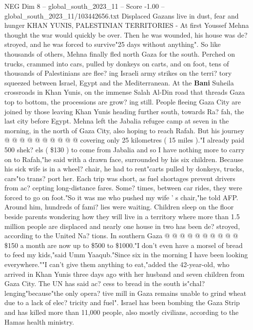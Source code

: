\begin{textsample}{NEG Dim 8 – global\_south\_2023\_11 – Score -1.00 – global\_south\_2023\_11/103442656.txt}  \label{ex:f8_neg_185}
Displaced Gazans live in dust, fear and hunger KHAN YUNIS, PALESTINIAN TERRITORIES - At first Youssef Mehna thought the war would quickly be over.
Then he was wounded, his house was de? stroyed, and he was forced to survive"25 days without anything".
So like thousands of others, Mehna finally fled north Gaza for the south.
Perched on trucks, crammed into cars, pulled by donkeys on carts, and on foot, tens of thousands of Palestinians are flee? ing Israeli army strikes on the terri? tory squeezed between Israel, Egypt and the Mediterranean.
At the \textbf{Bani} Suheila crossroads in Khan Yunis, on the immense Salah Al-Din road that threads Gaza top to bottom, the processions are grow? ing still.
People fleeing Gaza City are joined by those leaving Khan Yunis heading further south, towards Ra? fah, the last city before Egypt.
Mehna left the Jabalia refugee camp at seven in the morning, in the north of Gaza City, also hoping to reach Rafah.
But his journey @ @ @ @ @ @ @ @ @ @ covering only 25 kilometres ( 15 miles )."I already paid 500 shek? els ( \$130 ) to come from Jabalia and so I have nothing more to carry on to Rafah,"he said with a drawn face, surrounded by his six children.
Because his sick wife is in a wheel? chair, he had to rent"carts pulled by donkeys, trucks, cars"to trans? port her.
Each trip was short, as fuel shortages prevent drivers from ac? cepting long-distance fares.
Some? times, between car rides, they were forced to go on foot."So it was me who pushed my wife ' s chair,"he told AFP.
Around him, hundreds of fami? lies were waiting.
Children sleep on the floor beside parents wondering how they will live in a territory where more than 1.5 million people are displaced and nearly one house in two has been de? stroyed, according to the United Na? tions.
In southern Gaza @ @ @ @ @ @ @ @ @ @ \$150 a month are now up to \$500 to \$1000."I don't even have a morsel of bread to feed my kids,"said Umm Yaaqub."Since six in the morning I have been looking everywhere.""I can't give them anything to eat,"added the 42-year-old, who arrived in Khan Yunis three days ago with her husband and seven children from Gaza City.
The UN has said ac? cess to bread in the south is"chal? lenging"because"the only opera? tive mill in Gaza remains unable to grind wheat due to a lack of elec? tricity and fuel".
Israel has been bombing the Gaza Strip and has killed more than 11,000 people, also mostly civilians, according to the Hamas health ministry.

\end{textsample}
